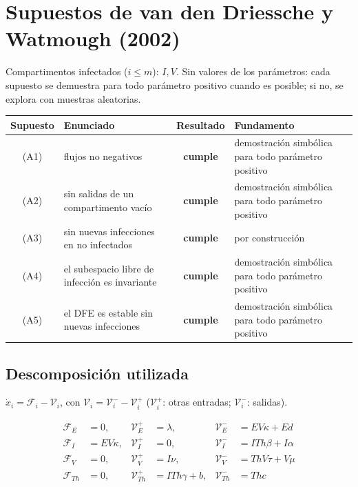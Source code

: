 \documentclass{article}
\begin{document}
\section*{Supuestos de van den Driessche y Watmough (2002)}

Compartimentos infectados ($i \le m$): $I, V$. Sin valores de los parámetros: cada supuesto se demuestra para todo parámetro positivo cuando es posible; si no, se explora con muestras aleatorias.

\begin{center}
\begin{tabular}{c p{} c p{}}
\hline
Supuesto & Enunciado & Resultado & Fundamento \\
\hline
(A1) & flujos no negativos & \textbf{cumple} & demostración simbólica para todo parámetro positivo \\
(A2) & sin salidas de un compartimento vacío & \textbf{cumple} & demostración simbólica para todo parámetro positivo \\
(A3) & sin nuevas infecciones en no infectados & \textbf{cumple} & por construcción \\
(A4) & el subespacio libre de infección es invariante & \textbf{cumple} & demostración simbólica para todo parámetro positivo \\
(A5) & el DFE es estable sin nuevas infecciones & \textbf{cumple} & demostración simbólica para todo parámetro positivo \\
\hline
\end{tabular}
\end{center}

\subsection*{Descomposición utilizada}

$\dot x_i = \mathcal{F}_i - \mathcal{V}_i$, con $\mathcal{V}_i = \mathcal{V}_i^- - \mathcal{V}_i^+$ ($\mathcal{V}_i^+$: otras entradas; $\mathcal{V}_i^-$: salidas).

\begin{align*}
\mathcal{F}_{E} &= 0, & \mathcal{V}_{E}^+ &= \lambda, & \mathcal{V}_{E}^- &= E V \kappa + E d \\
\mathcal{F}_{I} &= E V \kappa, & \mathcal{V}_{I}^+ &= 0, & \mathcal{V}_{I}^- &= I Th \beta + I \alpha \\
\mathcal{F}_{V} &= 0, & \mathcal{V}_{V}^+ &= I \nu, & \mathcal{V}_{V}^- &= Th V \tau + V \mu \\
\mathcal{F}_{Th} &= 0, & \mathcal{V}_{Th}^+ &= I Th \gamma + b, & \mathcal{V}_{Th}^- &= Th c
\end{align*}
\end{document}
